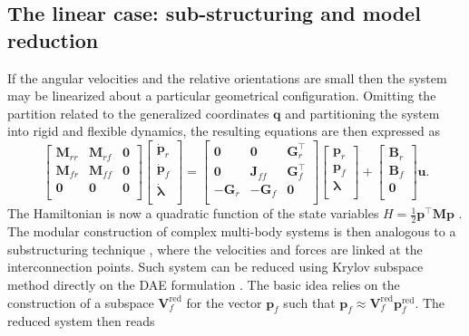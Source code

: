 \subsection{The linear case: sub-structuring and model reduction}
If the angular velocities and the relative orientations are small then the system may be linearized about a particular geometrical configuration. Omitting the partition related to the generalized coordinates $\mathbf{q}$ and partitioning the system into rigid and flexible dynamics, the resulting equations are then expressed as 
\begin{equation}
\label{eq:mbd_linear}
\begin{bmatrix}
\mathbf{M}_{rr} & \mathbf{M}_{rf} & \mathbf{0} \\ 
\mathbf{M}_{fr} & \mathbf{M}_{ff} & \mathbf{0} \\
\mathbf{0} & \mathbf{0} & \mathbf{0} \\
\end{bmatrix}
\begin{bmatrix}
\dot{\mathbf{p}}_r \\ \dot{\mathbf{p}}_f \\ \dot{\bm{\lambda}} \\ 
\end{bmatrix} = 
\begin{bmatrix}
\mathbf{0} & \mathbf{0} & \mathbf{G}_r^\top \\ 
\mathbf{0} & \mathbf{J}_{ff} & \mathbf{G}_f^\top \\ 
-\mathbf{G}_r & -\mathbf{G}_f & \mathbf{0} \\
\end{bmatrix}
\begin{bmatrix}
\mathbf{p}_r \\ \mathbf{p}_f \\ {\bm{\lambda}} \\ 
\end{bmatrix} + 
\begin{bmatrix}
\mathbf{B}_r \\ \mathbf{B}_f \\ \mathbf{0} \\
\end{bmatrix}\mathbf{u}.
\end{equation}
The Hamiltonian is now a quadratic function of the state variables $H = \frac{1}{2} \mathbf{p}^\top\mathbf{M}\mathbf{p}$ \cite{beattie2018linear}.
The modular construction of complex multi-body systems is then analogous to a substructuring technique \cite{klerk2008}, where the velocities and forces are linked at the interconnection points. Such system can be reduced using Krylov subspace method directly on the DAE formulation \cite{egger2018}. The basic idea relies on the construction of a subspace $\mathbf{V}_f^{\text{red}}$ for the vector $\mathbf{p}_f$ such that $\mathbf{p}_f \approx \mathbf{V}_f^{\text{red}} \mathbf{p}_f^{\text{red}}$. The reduced system then reads

